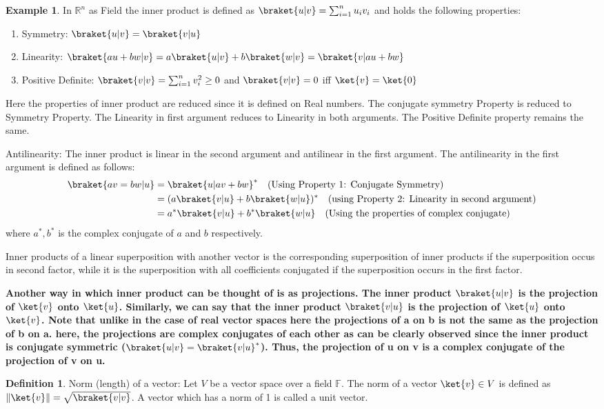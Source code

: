 \documentclass[12pt, oneside]{book}
\theoremstyle{definition}
\newtheorem{definition}{Definition}[section]
\theoremstyle{definition}
\newtheorem{example}{Example}[section]
\theoremstyle{remark}
\begin{document}
\begin{example}
    In $\mathbb{R}^n$ as Field the inner product is defined as $\braket{u|v}=\sum_{i=1}^{n}u_iv_i$
    and holds the following properties:
    \begin{enumerate}
        \item Symmetry: $\braket{u|v}=\braket{v|u}$
        \item Linearity: $\braket{au+bw|v}=a\braket{u|v}+b\braket{w|v}=\braket{v|au+bw}$
        \item Positive Definite: $\braket{v|v}=\sum_{i=1}^{n}v_i^2\geq 0$ and $\braket{v|v}=0$ iff $\ket{v}=\ket{0}$
    \end{enumerate}
    Here the properties of inner product are reduced since it is defined on Real numbers. The conjugate symmetry Property
    is reduced to Symmetry Property. The Linearity in first argument reduces to Linearity in both arguments. 
    The Positive Definite property remains the same.
\end{example}

Antilinearity: The inner product is linear in the second argument and antilinear in the first argument. The antilinearity in the first argument is defined as follows:
\begin{align*}
    \braket{av=bw|u}&=\braket{u|av+bw}^* \quad \text{(Using Property 1: Conjugate Symmetry)} \\
    &=(a\braket{v|u} + b\braket{w|u} )^* \quad \text{(using Property 2: Linearity in second argument)}\\
    &=a^*\braket{v|u}+b^*\braket{w|u} \quad \text{(Using the properties of complex conjugate)}\\
\end{align*}
where $a^*,b^*$ is the complex conjugate of $a$ and $b$ respectively. 

Inner products of a linear superposition with another vector is the corresponding superposition of inner products if the superposition
occus in second factor, while it is the superposition with all coefficients conjugated if the superposition occurs in the first factor.

\textbf{Another way in which inner product can be thought of is as projections. The inner product $\braket{u|v}$ is the projection 
of $\ket{v}$ onto $\ket{u}$. Similarly, we can say that the inner product $\braket{v|u}$ is the projection of $\ket{u}$ onto $\ket{v}$. Note that unlike in 
the case of real vector spaces here the projections of a on b is not the same as the projection of b on a. here, the projections are complex conjugates of each other as 
can be clearly observed since the inner product is conjugate symmetric ($\braket{u|v}=\braket{v|u}^*$). Thus, the projection of u on v is a complex conjugate of 
the projection of v on u.}
\begin{definition}
    Norm (length) of a vector: Let $V$ be a vector space over a field $\mathbb{F}$. The norm of a vector $\ket{v}\in V$ is defined as $\|\ket{v}\|=\sqrt{\braket{v|v}}$.
    A vector which has a norm of 1 is called a unit vector.
\end{definition}
\end{document}
